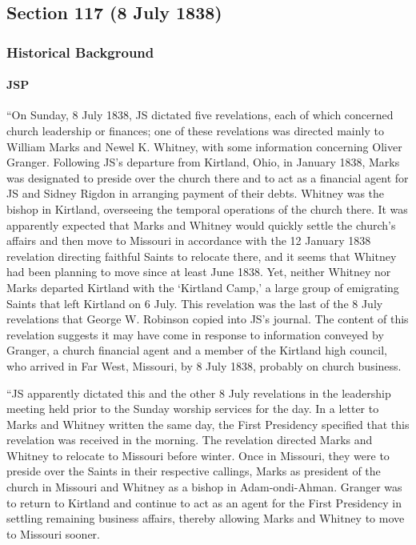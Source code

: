 \subsection{Section 117 (8 July 1838)}
	\label{DC117}
	
	\subsubsection{Historical Background}
		\label{DC117-HB}
		
		\paragraph{JSP}
		
			``On Sunday, 8 July 1838, JS dictated five revelations, each of which concerned church leadership or finances; one of these revelations was directed mainly to William Marks and Newel K. Whitney, with some information concerning Oliver Granger. Following JS's departure from Kirtland, Ohio, in January 1838, Marks was designated to preside over the church there and to act as a financial agent for JS and Sidney Rigdon in arranging payment of their debts. Whitney was the bishop in Kirtland, overseeing the temporal operations of the church there. It was apparently expected that Marks and Whitney would quickly settle the church's affairs and then move to Missouri in accordance with the 12 January 1838 revelation directing faithful Saints to relocate there, and it seems that Whitney had been planning to move since at least June 1838. Yet, neither Whitney nor Marks departed Kirtland with the `Kirtland Camp,' a large group of emigrating Saints that left Kirtland on 6 July. This revelation was the last of the 8 July revelations that George W. Robinson copied into JS's journal. The content of this revelation suggests it may have come in response to information conveyed by Granger, a church financial agent and a member of the Kirtland high council, who arrived in Far West, Missouri, by 8 July 1838, probably on church business.
			
			``JS apparently dictated this and the other 8 July revelations in the leadership meeting held prior to the Sunday worship services for the day. In a letter to Marks and Whitney written the same day, the First Presidency specified that this revelation was received in the morning. The revelation directed Marks and Whitney to relocate to Missouri before winter. Once in Missouri, they were to preside over the Saints in their respective callings, Marks as president of the church in Missouri and Whitney as a bishop in Adam-ondi-Ahman. Granger was to return to Kirtland and continue to act as an agent for the First Presidency in settling remaining business affairs, thereby allowing Marks and Whitney to move to Missouri sooner.
			
